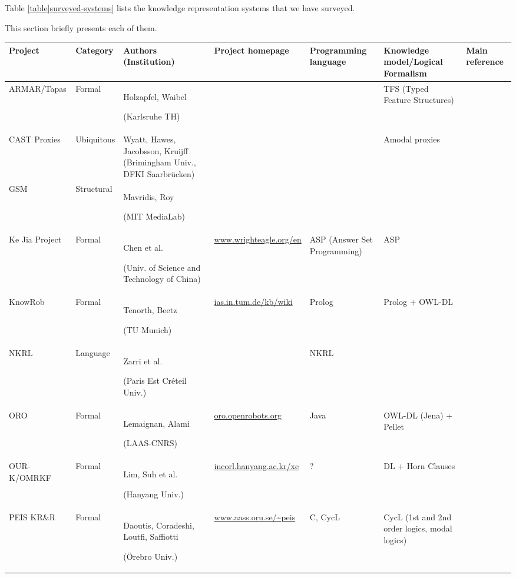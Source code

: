 \documentclass[a4paper, twocolumn]{article}
\begin{document}
Table \ref{table|surveyed-systems} lists the knowledge representation
systems that we have surveyed.

This section briefly presents each of them.

\begin{landscape}
\begin{table}\scriptsize
\begin{center}

\begin{tabular}{p{2.2cm}p{1.6cm}p{4cm}lp{2.4cm}p{3.4cm}p{1.5cm}}
\toprule
{\bf Project} & {\bf Category} & {\bf Authors (Institution)} & {\bf Project homepage} & {\bf Programming language} & {\bf Knowledge model/Logical Formalism} & Main reference \\
\midrule
ARMAR/Tapas & Formal & Holzapfel, Waibel \par (Karlsruhe TH) & & & TFS (Typed Feature Structures) & \cite{Holzapfel2008}\\
CAST Proxies & Ubiquitous & Wyatt, Hawes, Jacobsson, Kruijff (Brimingham Univ., DFKI Saarbrücken) & & & Amodal proxies & \cite{Jacobsson2008} \\
GSM & Structural & Mavridis, Roy \par (MIT MediaLab) & & & & \cite{Mavridis2006} \\
Ke Jia Project & Formal & Chen et al. \par (Univ. of Science and Technology of China) & \url{www.wrighteagle.org/en} & ASP (Answer Set Programming) & ASP & \cite{Chen2010} \\
{\sc KnowRob} & Formal & Tenorth, Beetz \par (TU Munich) & \url{ias.in.tum.de/kb/wiki} & {\sc Prolog} & {\sc Prolog} + OWL-DL &  \cite{Tenorth2009a} \\
NKRL & Language & Zarri et al. \par (Paris Est Créteil Univ.) & & NKRL & & \cite{Sabri2011} \\
ORO & Formal & Lemaignan, Alami \par (LAAS-CNRS) & \url{oro.openrobots.org} & {\sc Java} & OWL-DL ({\sc Jena}) + {\sc Pellet} & \cite{Lemaignan2010} \\
OUR-K/OMRKF & Formal & Lim, Suh et al. \par (Hanyang Univ.) & \url{incorl.hanyang.ac.kr/xe} & ? & DL + Horn Clauses &  \cite{Lim2011, Suh2007} \\
PEIS KR\&R & Formal & Daoutis, Coradeshi, Loutfi, Saffiotti \par (Örebro Univ.) & \url{www.aass.oru.se/~peis} & {\sc C}, {\sc CycL} & CycL (1st and 2nd order logics, modal logics) & \cite{Daoutis2009} \\

\end{tabular}
\end{center}
\end{table}
\end{landscape}
\end{document}
